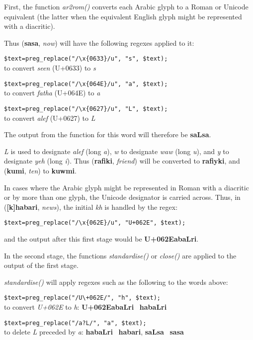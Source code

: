 First, the function \textit{ar2rom()} converts each Arabic glyph to a Roman or Unicode equivalent (the latter when the equivalent English glyph might be represented with a diacritic).

Thus  (\textbf{sasa}, \textit{now}) will have the following regexes applied to it:

\verb|$text=preg_replace("/\x{0633}/u", "s", $text);|\\
to convert \textit{seen} (U+0633) to \textit{s}

\verb|$text=preg_replace("/\x{064E}/u", "a", $text);|\\
to convert \textit{fatha} (U+064E) to \textit{a}

\verb|$text=preg_replace("/\x{0627}/u", "L", $text);|\\
to convert \textit{alef} (U+0627) to \textit{L}

The output from the function for this word will therefore be \textbf{saLsa}.

\textit{L} is used to designate \textit{alef} (long \textit{a}), \textit{w} to designate \textit{waw} (long \textit{u}), and \textit{y} to designate \textit{yeh} (long \textit{i}).  Thus  (\textbf{rafiki}, \textit{friend}) will be converted to \textbf{rafiyki}, and  (\textbf{kumi}, \textit{ten}) to \textbf{kuwmi}.

In cases where the Arabic glyph might be represented in Roman with a diacritic or by more than one glyph, the Unicode designator is carried across.  Thus, in  (\textbf{[k]habari}, \textit{news}), the initial \textit{kh} is handled by the regex:

\verb|$text=preg_replace("/\x{062E}/u", "U+062E", $text);|

and the output after this first stage would be \textbf{U+062EabaLri}.

In the second stage, the functions \textit{standardise()} or \textit{close()} are applied to the output of the first stage.

\textit{standardise()} will apply regexes such as the following to the words above:

\verb|$text=preg_replace("/U\+062E/", "h", $text);|\\
to convert \textit{U+062E} to \textit{h}: \textbf{U+062EabaLri} \textrightarrow\ \textbf{habaLri}

\verb|$text=preg_replace("/a?L/", "a", $text);|\\
to delete \textit{L} preceded by \textit{a}: \textbf{habaLri} \textrightarrow\ \textbf{habari}, \textbf{saLsa} \textrightarrow\ \textbf{sasa}

